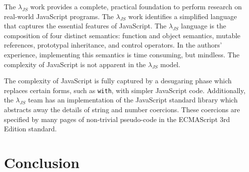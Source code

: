 \documentclass[10pt,letter,english]{article}
\newcommand{\js}[0]{JavaScript}
\newcommand{\lambdajs}[0]{$\lambda_{JS}$}
\begin{document}
The \lambdajs{} work provides a complete, practical foundation to perform
research on real-world JavaScript programs. The \lambdajs{} work identifies a
simplified language that captures the essential features of \js{}. The
\lambdajs{} language is the composition of four distinct semantics: function and
object semantics, mutable references, prototypal inheritance, and control
operators. In the authors' experience, implementing this semantics is time
consuming, but mindless. The complexity of \js{} is not apparent in the
\lambdajs{} model.

The complexity of \js{} is fully captured by a desugaring phase which replaces
certain forms, such as \texttt{with}, with simpler \js{} code. Additionally, the
\lambdajs{} team has an implementation of the \js{} standard library which
abstracts away the details of string and number coercions. These coercions are
specified by many pages of non-trivial pseudo-code in the ECMAScript 3rd Edition
standard.

\section{Conclusion}



{}

\end{document}
